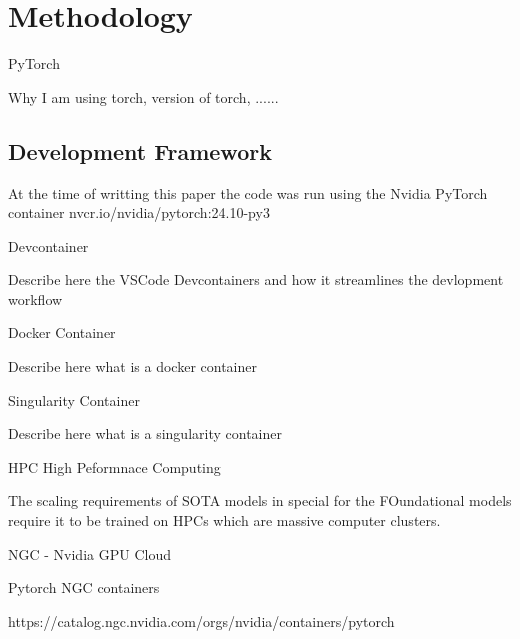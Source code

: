 \documentclass{article}
\begin{document}

\section{Methodology}

PyTorch

Why I am using torch, version of torch, ......

\subsection{Development Framework}

At the time of writting this paper the code was run using the Nvidia PyTorch container nvcr.io/nvidia/pytorch:24.10-py3

Devcontainer

Describe here the VSCode Devcontainers and how it streamlines the devlopment workflow

Docker Container

Describe here what is a docker container

Singularity Container

Describe here what is a singularity container

HPC High Peformnace Computing

The scaling requirements of SOTA models in special for the FOundational models require it to be trained on HPCs which are massive computer clusters.

NGC - Nvidia GPU Cloud

Pytorch NGC containers

https://catalog.ngc.nvidia.com/orgs/nvidia/containers/pytorch
\end{document}
